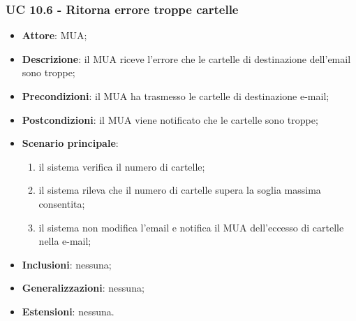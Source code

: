     \subsubsection{UC 10.6 - Ritorna errore troppe cartelle} \label{sec:UC10.6}
    \begin{itemize}
        \item \textbf{Attore}: MUA;
        \item \textbf{Descrizione}: il MUA riceve l'errore che le cartelle di destinazione dell'email sono troppe;
        \item \textbf{Precondizioni}: il MUA ha trasmesso le cartelle di destinazione e-mail;
        \item \textbf{Postcondizioni}: il MUA viene notificato che le cartelle sono troppe;
        \item \textbf{Scenario principale}:
            \begin{enumerate}
                \item il sistema verifica il numero di cartelle;
                \item il sistema rileva che il numero di cartelle supera la soglia massima consentita;
                \item il sistema non modifica l'email e notifica il MUA dell'eccesso di cartelle nella e-mail;
            \end{enumerate}
        \item \textbf{Inclusioni}: nessuna;
        \item \textbf{Generalizzazioni}: nessuna;
        \item \textbf{Estensioni}: nessuna.
    \end{itemize}
